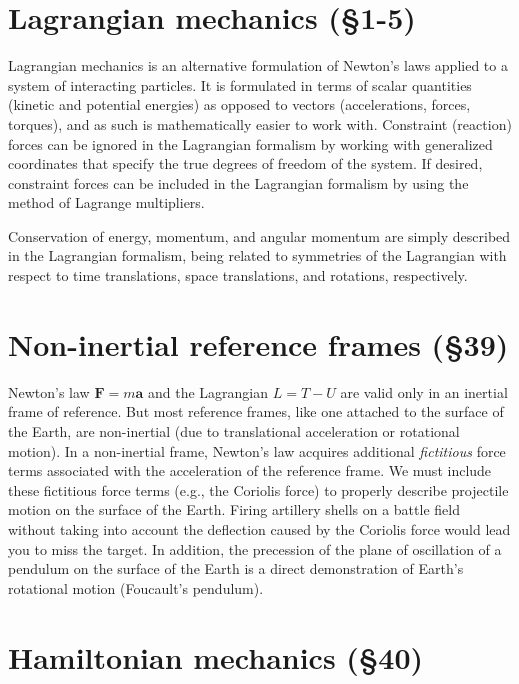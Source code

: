 \documentclass[10pt]{article}
\numberwithin{equation}{section}
\renewcommand{\vec}[1]{\mathbf{#1}}
\begin{document}
\section{Lagrangian mechanics (\S1-5)}

Lagrangian mechanics is an alternative formulation of
Newton's laws applied to a system of interacting particles.
It is formulated in terms of scalar quantities (kinetic
and potential energies) as opposed to vectors
(accelerations, forces, torques), and as such is mathematically
easier to work with.
Constraint (reaction) forces can be ignored in the 
Lagrangian formalism by working with generalized coordinates
that specify the true degrees of freedom of the system.
If desired, constraint forces can be included in the 
Lagrangian formalism by using the method of Lagrange multipliers.

Conservation of energy, momentum, and angular momentum are 
simply described in the Lagrangian formalism, being related 
to symmetries of the Lagrangian with respect to time 
translations, space translations, and rotations, respectively.

\section{Non-inertial reference frames (\S39)}

Newton's law $\vec F=m \vec a$ and the Lagrangian
$L=T-U$ are valid only in an inertial frame of 
reference.
But most reference frames, like one attached to
the surface of the Earth, are non-inertial 
(due to translational acceleration or rotational motion).
In a non-inertial frame, Newton's law acquires additional
{\em fictitious} force terms associated with the 
acceleration of the reference frame.
We must include these fictitious force terms (e.g.,
the Coriolis force) to properly describe projectile motion
on the surface of the Earth.
Firing artillery shells on a battle field without taking
into account the deflection caused by the Coriolis force
would lead you to miss the target.
In addition, the precession of the plane of oscillation of 
a pendulum on the surface of the Earth is a direct demonstration 
of Earth's rotational motion (Foucault's pendulum).

\section{Hamiltonian mechanics (\S40)}
\end{document}
